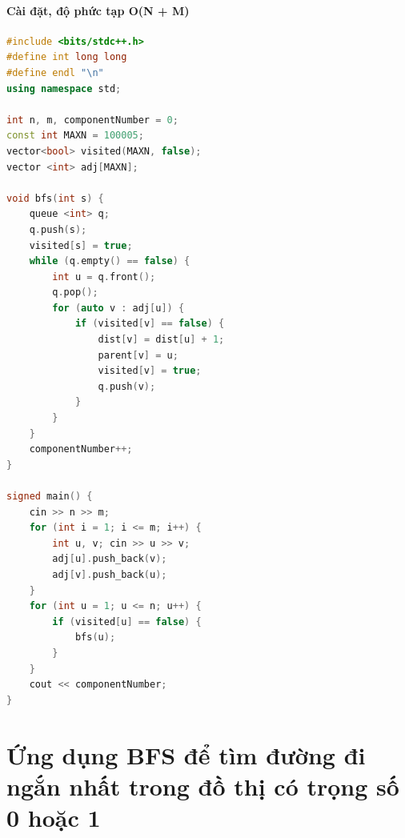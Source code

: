 \paragraph{Cài đặt, độ phức tạp O(N + M)}
\begin{lstlisting}[language=C++]
#include <bits/stdc++.h>
#define int long long
#define endl "\n"
using namespace std;

int n, m, componentNumber = 0; 
const int MAXN = 100005;
vector<bool> visited(MAXN, false);
vector <int> adj[MAXN];

void bfs(int s) { 
    queue <int> q;
    q.push(s);
    visited[s] = true;
    while (q.empty() == false) {
        int u = q.front();
        q.pop();
        for (auto v : adj[u]) {
            if (visited[v] == false) {
                dist[v] = dist[u] + 1;
                parent[v] = u;
                visited[v] = true;
                q.push(v);
            }
        }
    }
    componentNumber++;
}

signed main() {
    cin >> n >> m;
    for (int i = 1; i <= m; i++) {
        int u, v; cin >> u >> v;
        adj[u].push_back(v);
        adj[v].push_back(u);
    }
    for (int u = 1; u <= n; u++) {
        if (visited[u] == false) {
            bfs(u);
        }
    }
    cout << componentNumber;
}
\end{lstlisting}

\section{Ứng dụng BFS để tìm đường đi ngắn nhất trong đồ thị có trọng số 0 hoặc 1}

